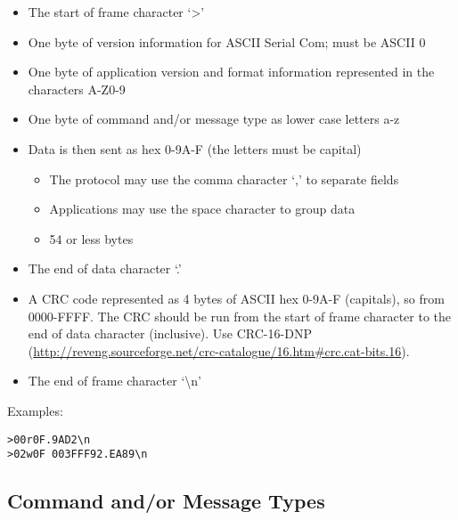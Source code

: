 \documentclass{customdocclass}
\begin{document}
\begin{itemize}
  \item The start of frame character `>'
  \item One byte of version information for ASCII Serial Com; must be ASCII 0
  \item One byte of application version and format information represented in the characters A-Z0-9
  \item One byte of command and/or message type as lower case letters a-z
  \item Data is then sent as hex 0-9A-F (the letters must be capital)
  \begin{itemize}
    \item The protocol may use the comma character `,' to separate fields
    \item Applications may use the space character to group data
    \item 54 or less bytes
  \end{itemize}
  \item The end of data character `.'
  \item A CRC code represented as 4 bytes of ASCII hex 0-9A-F (capitals), so from 0000-FFFF. The CRC should be run from the start of frame character to the end of data character (inclusive). Use CRC-16-DNP (\url{http://reveng.sourceforge.net/crc-catalogue/16.htm\#crc.cat-bits.16}).
  \item The end of frame character `\textbackslash n'
\end{itemize}

Examples:

\begin{lstlisting}
>00r0F.9AD2\n
>02w0F 003FFF92.EA89\n
\end{lstlisting}

\subsection{Command and/or Message Types}
\end{document}

